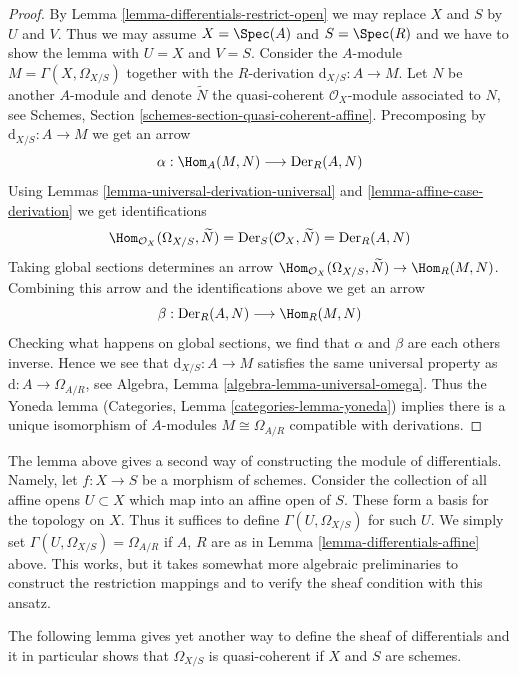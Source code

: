 \begin{proof}
By Lemma \ref{lemma-differentials-restrict-open} we may replace
$X$ and $S$ by $U$ and $V$. Thus we may assume $X = \Spec(A)$
and $S = \Spec(R)$ and we have to show the lemma with $U = X$
and $V = S$. Consider the $A$-module $M = \Gamma(X, \Omega_{X/S})$
together with the $R$-derivation $\text{d}_{X/S} : A \to M$.
Let $N$ be another $A$-module and denote $\widetilde{N}$ the quasi-coherent
$\mathcal{O}_X$-module associated to $N$, see
Schemes, Section \ref{schemes-section-quasi-coherent-affine}.
Precomposing by $\text{d}_{X/S} : A \to M$ we get an arrow
$$
\alpha : \Hom_A(M, N) \longrightarrow \text{Der}_R(A, N)
$$
Using Lemmas \ref{lemma-universal-derivation-universal} and
\ref{lemma-affine-case-derivation} we get identifications
$$
\Hom_{\mathcal{O}_X}(\Omega_{X/S}, \widetilde{N}) =
\text{Der}_S(\mathcal{O}_X, \widetilde{N}) =
\text{Der}_R(A, N)
$$
Taking global sections determines an arrow
$\Hom_{\mathcal{O}_X}(\Omega_{X/S}, \widetilde{N}) \to \Hom_R(M, N)$.
Combining this arrow and the identifications above we get an arrow
$$
\beta : \text{Der}_R(A, N) \longrightarrow \Hom_R(M, N)
$$
Checking what happens on global sections, we find that $\alpha$
and $\beta$ are each others inverse. Hence we see that
$\text{d}_{X/S} : A \to M$ satisfies
the same universal property as $\text{d} : A \to \Omega_{A/R}$,
see Algebra, Lemma \ref{algebra-lemma-universal-omega}. Thus the Yoneda lemma
(Categories, Lemma \ref{categories-lemma-yoneda})
implies there is a unique isomorphism of $A$-modules
$M \cong \Omega_{A/R}$ compatible with derivations.
\end{proof}

\begin{remark}
\label{remark-differentials-glue}
The lemma above gives a second way of constructing the module of
differentials. Namely, let $f : X \to S$ be a morphism of schemes.
Consider the collection of all affine opens $U \subset X$ which
map into an affine open of $S$. These form a basis for the topology
on $X$. Thus it suffices to define $\Gamma(U, \Omega_{X/S})$
for such $U$. We simply set $\Gamma(U, \Omega_{X/S}) = \Omega_{A/R}$ if
$A$, $R$ are as in Lemma \ref{lemma-differentials-affine} above.
This works, but it takes somewhat more algebraic preliminaries
to construct the restriction mappings and to verify the sheaf
condition with this ansatz.
\end{remark}

\noindent
The following lemma gives yet another way to define the sheaf of
differentials and it in particular shows that $\Omega_{X/S}$
is quasi-coherent if $X$ and $S$ are schemes.

